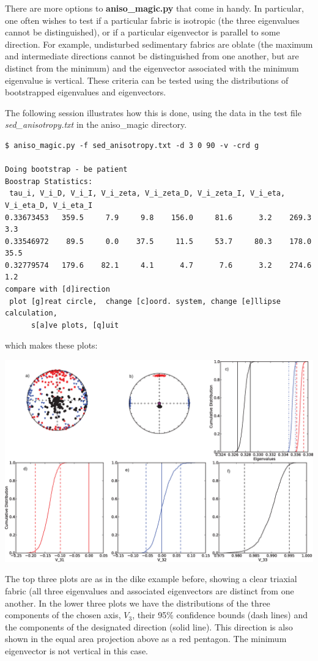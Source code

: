\documentclass[11pt]{book}
\begin{document}
{There are more options to {\bf aniso\_magic.py} that come in handy.   In particular, one often wishes to test if a particular fabric is isotropic (the three eigenvalues cannot be distinguished), or if a particular eigenvector is parallel to some direction. For example, undisturbed sedimentary fabrics are oblate (the maximum and intermediate directions cannot be distinguished from one another, but are distinct from the minimum) and the eigenvector associated with the minimum eigenvalue is vertical. These criteria can be tested using the distributions of bootstrapped eigenvalues and eigenvectors.

The following session illustrates how this is done, using the data in the test file {\it sed\_anisotropy.txt} in the aniso\_magic directory.

\begin{verbatim}
$ aniso_magic.py -f sed_anisotropy.txt -d 3 0 90 -v -crd g

Doing bootstrap - be patient
Boostrap Statistics:
 tau_i, V_i_D, V_i_I, V_i_zeta, V_i_zeta_D, V_i_zeta_I, V_i_eta, V_i_eta_D, V_i_eta_I
0.33673453   359.5     7.9     9.8    156.0     81.6      3.2    269.3      3.3
0.33546972    89.5     0.0    37.5     11.5     53.7     80.3    178.0     35.5
0.32779574   179.6    82.1     4.1      4.7      7.6      3.2    274.6      1.2
compare with [d]irection
 plot [g]reat circle,  change [c]oord. system, change [e]llipse calculation,
      s[a]ve plots, [q]uit
 \end{verbatim}

 which makes these plots:

   \includegraphics[width=15cm]{EPSfiles/sed-aniso.eps}

   The top three plots are as in the dike example before, showing a clear triaxial fabric (all three eigenvalues and associated eigenvectors are distinct from one another.  In the lower three plots we have the distributions of the three components of the chosen axis,  $V_3$, their 95\% confidence bounds (dash lines) and the components of the designated direction (solid line).  This direction is also shown in the equal area projection above as a red pentagon.  The minimum eigenvector is not vertical in this case.



}
\end{document}
